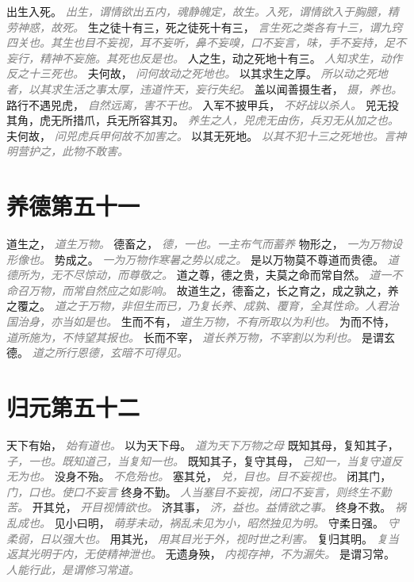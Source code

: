 \documentclass[a4paper,zihao=-4,oneside,landscape,UTF8]{ctexart}
\newcommand{\zhushi}[1]{\scriptsize{\textit{\textcolor{gray}{#1}}}\normalsize}
\begin{document}
出生入死。
\zhushi{出生，谓情欲出五内，魂静魄定，故生。入死，谓情欲入于胸臆，精劳神惑，故死。}
生之徒十有三，死之徒死十有三，
\zhushi{言生死之类各有十三，谓九窍四关也。其生也目不妄视，耳不妄听，鼻不妄嗅，口不妄言，味，手不妄持，足不妄行，精神不妄施。其死也反是也。}
人之生，动之死地十有三。
\zhushi{人知求生，动作反之十三死也。}
夫何故，
\zhushi{问何故动之死地也。}
以其求生之厚。
\zhushi{所以动之死地者，以其求生活之事太厚，违道忤天，妄行失纪。}
盖以闻善摄生者，
\zhushi{摄，养也。}
路行不遇兕虎，
\zhushi{自然远离，害不干也。}
入军不披甲兵，
\zhushi{不好战以杀人。}
兕无投其角，虎无所措爪，兵无所容其刃。
\zhushi{养生之人，兕虎无由伤，兵刃无从加之也。}
夫何故，
\zhushi{问兕虎兵甲何故不加害之。}
以其无死地。
\zhushi{以其不犯十三之死地也。言神明营护之，此物不敢害。}


\section{养德第五十一}

道生之，
\zhushi{道生万物。}
德畜之，
\zhushi{德，一也。一主布气而蓄养}
物形之，
\zhushi{一为万物设形像也。}
势成之。
\zhushi{一为万物作寒暑之势以成之。}
是以万物莫不尊道而贵德。
\zhushi{道德所为，无不尽惊动，而尊敬之。}
道之尊，德之贵，夫莫之命而常自然。
\zhushi{道一不命召万物，而常自然应之如影响。}
故道生之，德畜之，长之育之，成之孰之，养之覆之。
\zhushi{道之于万物，非但生而已，乃复长养、成孰、覆育，全其性命。人君治国治身，亦当如是也。}
生而不有，
\zhushi{道生万物，不有所取以为利也。}
为而不恃，
\zhushi{道所施为，不恃望其报也。}
长而不宰，
\zhushi{道长养万物，不宰割以为利也。}
是谓玄德。
\zhushi{道之所行恩德，玄暗不可得见。}


\section{归元第五十二}

天下有始，
\zhushi{始有道也。}
以为天下母。
\zhushi{道为天下万物之母}
既知其母，复知其子，
\zhushi{子，一也。既知道己，当复知一也。}
既知其子，复守其母，
\zhushi{己知一，当复守道反无为也。}
没身不殆。
\zhushi{不危殆也。}
塞其兑，
\zhushi{兑，目也。目不妄视也。}
闭其门，
\zhushi{门，口也。使口不妄言}
终身不勤。
\zhushi{人当塞目不妄视，闭口不妄言，则终生不勤苦。}
开其兑，
\zhushi{开目视情欲也。}
济其事，
\zhushi{济，益也。益情欲之事。}
终身不救。
\zhushi{祸乱成也。}
见小曰明，
\zhushi{萌芽未动，祸乱未见为小，昭然独见为明。}
守柔日强。
\zhushi{守柔弱，日以强大也。}
用其光，
\zhushi{用其目光于外，视时世之利害。}
复归其明。
\zhushi{复当返其光明于内，无使精神泄也。}
无遗身殃，
\zhushi{内视存神，不为漏失。}
是谓习常。
\zhushi{人能行此，是谓修习常道。}
\end{document}
